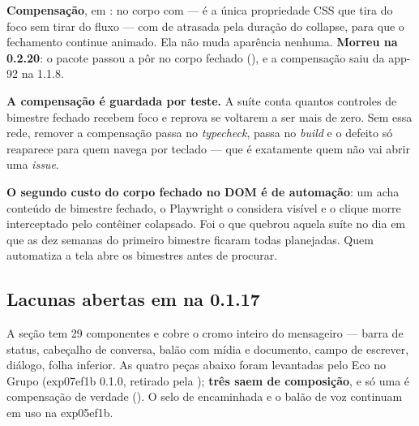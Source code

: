 \textbf{Compensação}, em :
 no corpo com  --- é a única
propriedade CSS que tira do foco sem tirar do fluxo --- com  de
 atrasada pela duração do collapse, para que o fechamento
continue animado. Ela não muda aparência nenhuma. \textbf{Morreu na 0.2.20}:
o pacote passou a pôr  no corpo fechado (), e a
compensação saiu da app-92 na 1.1.8.

\begin{regra}
\textbf{A compensação é guardada por teste.} A suíte
 conta quantos controles de bimestre fechado
recebem foco e reprova se voltarem a ser mais de zero. Sem essa rede, remover a
compensação passa no \emph{typecheck}, passa no \emph{build} e o defeito só
reaparece para quem navega por teclado --- que é exatamente quem não vai abrir
uma \emph{issue}.
\end{regra}

\textbf{O segundo custo do corpo fechado no DOM é de automação}: um
 acha conteúdo de bimestre fechado, o Playwright o
considera visível e o clique morre interceptado pelo contêiner colapsado. Foi o
que quebrou aquela suíte no dia em que as dez semanas do primeiro bimestre
ficaram todas planejadas. Quem automatiza a tela abre os bimestres antes de
procurar.

\subsection{Lacunas abertas em  na 0.1.17}

A seção tem 29 componentes e cobre o cromo inteiro do mensageiro --- barra de
status, cabeçalho de conversa, balão com mídia e documento, campo de escrever,
diálogo, folha inferior. As quatro peças abaixo foram levantadas pelo Eco no
Grupo (exp07ef1b 0.1.0, retirado pela ); \textbf{três saem de
composição}, e só uma é compensação de verdade (). O selo de
encaminhada e o balão de voz continuam em uso na exp05ef1b.

